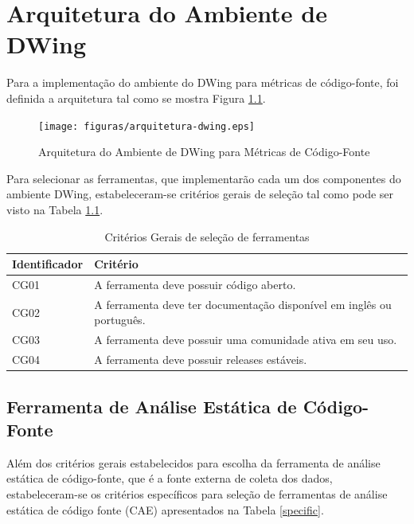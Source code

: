 \chapter{Arquitetura do Ambiente de DWing}
\label{arquitetura}


Para a implementação do ambiente do DWing para métricas de código-fonte, foi definida a arquitetura tal como se mostra Figura \ref{arquitetura}.


\begin{figure}[ht!]
\centering
\texttt{[image: figuras/arquitetura-dwing.eps]}
\caption{Arquitetura do Ambiente de DWing para Métricas de Código-Fonte}
\label{arquitetura}
\end{figure}
\FloatBarrier

Para selecionar as ferramentas, que implementarão cada um dos componentes do ambiente DWing, estabeleceram-se critérios gerais de seleção tal como pode ser visto na Tabela \ref{seleção}.


	\begin{table}[!ht]
	\begin{center}
	 \begin{tabular}{|l|l|}
		\hline
		Identificador & Critério 
		\\ \hline
		CG01 & A ferramenta deve possuir código aberto.  
		\\ \hline
		CG02 & A ferramenta deve ter documentação disponível em inglês ou português.      
		\\ \hline
		CG03 & A ferramenta deve possuir uma comunidade ativa em seu uso.
		\\ \hline
		CG04 & A ferramenta deve possuir releases estáveis.    
		\\ \hline
		\end{tabular}
		\caption{Critérios Gerais de seleção de ferramentas}
		\label{seleção}
		\end{center}
		\end{table}	


\section{Ferramenta de Análise Estática de Código-Fonte}

Além dos critérios gerais estabelecidos para escolha da ferramenta de análise estática de código-fonte, que é a fonte externa de coleta dos dados, estabeleceram-se os critérios específicos para seleção de ferramentas de análise estática de código fonte (CAE) apresentados na Tabela \ref{specific}.


